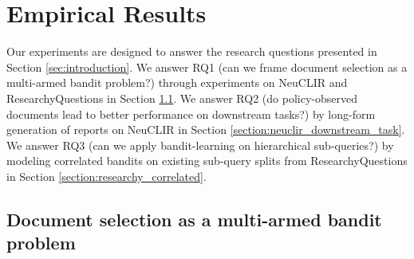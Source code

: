 \section{Empirical Results}

Our experiments are designed to answer the research questions presented in Section \ref{sec:introduction}. We answer RQ1 (can we frame document selection as a multi-armed bandit problem?) through experiments on NeuCLIR and ResearchyQuestions in Section \ref{section:neuclir_eval}. We answer RQ2 (do policy-observed documents lead to better performance on downstream tasks?) by long-form generation of reports on NeuCLIR in Section \ref{section:neuclir_downstream_task}. We answer RQ3 (can we apply bandit-learning on hierarchical sub-queries?) by modeling correlated bandits on existing sub-query splits from ResearchyQuestions in Section \ref{section:researchy_correlated}. 


\subsection{Document selection as a multi-armed bandit problem}\label{section:neuclir_eval}

